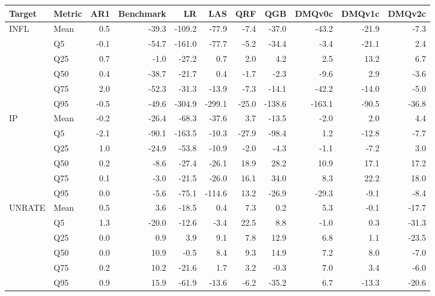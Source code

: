 \begin{tabular}{llrrrrrrrrr}
\toprule
Target & Metric & AR1 & Benchmark & LR & LAS & QRF & QGB & DMQv0c & DMQv1c & DMQv2c \\
\midrule
\multirow{6}{*}{INFL} & Mean & 0.5 & -39.3 & -109.2 & -77.9 & -7.4 & -37.0 & -43.2 & -21.9 & -7.3 \\
 & Q5 & -0.1 & -54.7 & -161.0 & -77.7 & -5.2 & -34.4 & -3.4 & -21.1 & 2.4 \\
 & Q25 & 0.7 & -1.0 & -27.2 & 0.7 & 2.0 & 4.2 & 2.5 & 13.2 & 6.7 \\
 & Q50 & 0.4 & -38.7 & -21.7 & 0.4 & -1.7 & -2.3 & -9.6 & 2.9 & -3.6 \\
 & Q75 & 2.0 & -52.3 & -31.3 & -13.9 & -7.3 & -14.1 & -42.2 & -14.0 & -5.0 \\
 & Q95 & -0.5 & -49.6 & -304.9 & -299.1 & -25.0 & -138.6 & -163.1 & -90.5 & -36.8 \\
\midrule
\multirow{6}{*}{IP} & Mean & -0.2 & -26.4 & -68.3 & -37.6 & 3.7 & -13.5 & -2.0 & 2.0 & 4.4 \\
 & Q5 & -2.1 & -90.1 & -163.5 & -10.3 & -27.9 & -98.4 & 1.2 & -12.8 & -7.7 \\
 & Q25 & 1.0 & -24.9 & -53.8 & -10.9 & -2.0 & -4.3 & -1.1 & -7.2 & 3.0 \\
 & Q50 & 0.2 & -8.6 & -27.4 & -26.1 & 18.9 & 28.2 & 10.9 & 17.1 & 17.2 \\
 & Q75 & 0.1 & -3.0 & -21.5 & -26.0 & 16.1 & 34.0 & 8.3 & 22.2 & 18.0 \\
 & Q95 & 0.0 & -5.6 & -75.1 & -114.6 & 13.2 & -26.9 & -29.3 & -9.1 & -8.4 \\
\midrule
\multirow{6}{*}{UNRATE} & Mean & 0.5 & 3.6 & -18.5 & 0.4 & 7.3 & 0.2 & 5.3 & -0.1 & -17.7 \\
 & Q5 & 1.3 & -20.0 & -12.6 & -3.4 & 22.5 & 8.8 & -1.0 & 0.3 & -31.3 \\
 & Q25 & 0.0 & 0.9 & 3.9 & 9.1 & 7.8 & 12.9 & 6.8 & 1.1 & -23.5 \\
 & Q50 & 0.0 & 10.9 & -0.5 & 8.4 & 9.3 & 14.9 & 7.2 & 8.0 & -7.0 \\
 & Q75 & 0.2 & 10.2 & -21.6 & 1.7 & 3.2 & -0.3 & 7.0 & 3.4 & -6.0 \\
 & Q95 & 0.9 & 15.9 & -61.9 & -13.6 & -6.2 & -35.2 & 6.7 & -13.3 & -20.6 \\
\bottomrule
\end{tabular}
